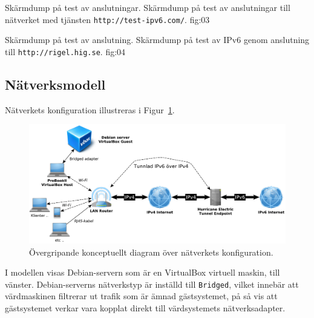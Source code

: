            {Skärmdump på test av anslutningar.}
           {Skärmdump på test av anslutningar till nätverket med tjänsten
            \texttt{http://test-ipv6.com/}.}
           {fig:03}

           {Skärmdump på test av anslutning.}
					 {Skärmdump på test av IPv6 genom anslutning till
						\texttt{http://rigel.hig.se}.}
           {fig:04}


\subsection{Nätverksmodell}
Nätverkets konfiguration illustreras i Figur~\ref{fig:networkgraph}.

\begin{figure}[H]
  \centering
  \includegraphics[width=\linewidth]{include/networkgraph}
  \caption[Diagram över nätverkets konfiguration.]
          {Övergripande konceptuellt diagram över nätverkets
           konfiguration.}
  \label{fig:networkgraph}
\end{figure}

I modellen visas Debian-servern som är en VirtualBox virtuell maskin, till
vänster. Debian-serverns nätverkstyp är inställd till \texttt{Bridged}, vilket
innebär att värdmaskinen filtrerar ut trafik som är ämnad gästsystemet, på så
vis att gästsystemet verkar vara kopplat direkt till värdsystemets
nätverksadapter.
